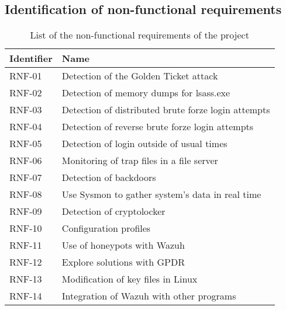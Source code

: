 \subsection{Identification of non-functional requirements}
\newcommand{\RNFuno}{Detection of the Golden Ticket attack}
\newcommand{\RNFdos}{Detection of memory dumps for lsass.exe}
\newcommand{\RNFtres}{Detection of distributed brute forze login attempts}
\newcommand{\RNFcuatro}{Detection of reverse brute forze login attempts}
\newcommand{\RNFcinco}{Detection of login outside of usual times}
\newcommand{\RNFseis}{Monitoring of trap files in a file server}
\newcommand{\RNFsiete}{Detection of backdoors}
\newcommand{\RNFocho}{Use Sysmon to gather system's data in real time}
\newcommand{\RNFnueve}{Detection of cryptolocker}
\newcommand{\RNFdiez}{Configuration profiles}
\newcommand{\RNFonce}{Use of honeypots with Wazuh}
\newcommand{\RNFdoce}{Explore solutions with GPDR}
\newcommand{\RNFtrece}{Modification of key files in Linux}
\newcommand{\RNFcatorce}{Integration of Wazuh with other programs}

\begin{table}[H]
	\begin{tabularx}{\textwidth}{|l|X|}
		\hline
		\rowcolor{gray!30}
		Identifier & Name \\ \hline
		RNF-01 & \RNFuno \\ \hline
		RNF-02 & \RNFdos \\ \hline
		RNF-03 & \RNFtres \\ \hline
		RNF-04 & \RNFcuatro \\ \hline
		RNF-05 & \RNFcinco \\ \hline
		RNF-06 & \RNFseis \\ \hline
		RNF-07 & \RNFsiete \\ \hline
		RNF-08 & \RNFocho \\ \hline
		RNF-09 & \RNFnueve \\ \hline
		RNF-10 & \RNFdiez \\ \hline
		RNF-11 & \RNFonce \\ \hline
		RNF-12 & \RNFdoce \\ \hline
		RNF-13 & \RNFtrece \\ \hline
		RNF-14 & \RNFcatorce \\ \hline
	\end{tabularx}
	\caption{List of the non-functional requirements of the project}
\end{table}

